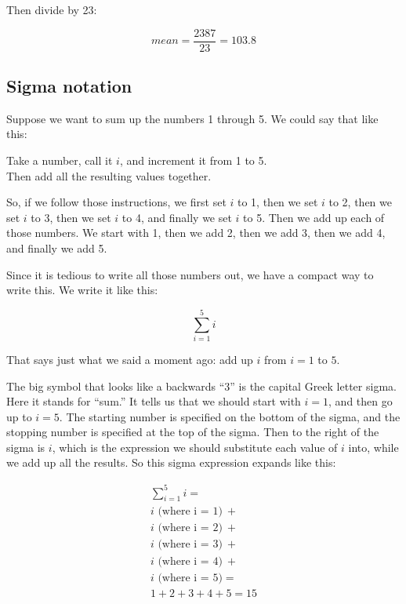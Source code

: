 \documentclass[../../../main.tex]{subfiles}
\begin{document}
\noindent
Then divide by 23:

\begin{equation*}
  mean = \frac{2387}{23} = 103.8
\end{equation*}


\subsection{Sigma notation}

Suppose we want to sum up the numbers 1 through 5. We could say that like this:

\begin{center}
  Take a number, call it $i$, and increment it from 1 to 5.  \\
  Then add all the resulting values together. 
\end{center}

\noindent
So, if we follow those instructions, we first set $i$ to 1, then we set $i$ to 2, then we set $i$ to 3, then we set $i$ to 4, and finally we set $i$ to 5. Then we add up each of those numbers. We start with 1, then we add 2, then we add 3, then we add 4, and finally we add 5. 

Since it is tedious to write all those numbers out, we have a compact way to write this. We write it like this:

\begin{equation*}
  \sum_{i=1}^{5} i
\end{equation*}

\noindent
That says just what we said a moment ago: add up $i$ from $i = 1$ to $5$.

The big symbol that looks like a backwards ``3'' is the capital Greek letter sigma. Here it stands for ``sum.'' It tells us that we should start with $i = 1$, and then go up to $i = 5$. The starting number is specified on the bottom of the sigma, and the stopping number is specified at the top of the sigma. Then to the right of the sigma is $i$, which is the expression we should substitute each value of $i$ into, while we add up all the results. So this sigma expression expands like this:

\begin{multline*}
  \sum_{i=1}^{5} i = \\
  i\text{ (where i = 1)}~+ \\
  i\text{ (where i = 2)}~+ \\
  i\text{ (where i = 3)}~+  \\
  i\text{ (where i = 4)}~+ \\
  i\text{ (where i = 5)} = \\
  1 + 2 + 3 + 4 + 5 = 15
\end{multline*}
\end{document}
